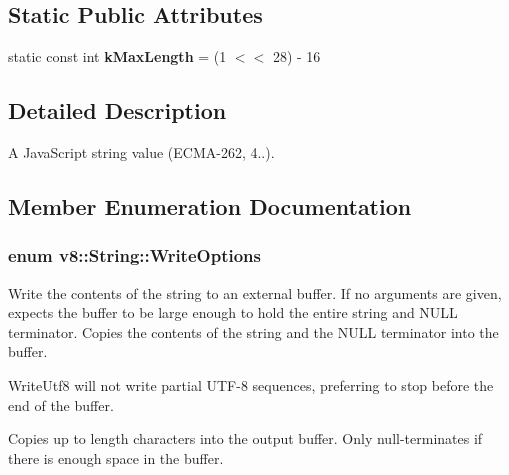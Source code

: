 \subsection*{Static Public Attributes}
\begin{DoxyCompactItemize}
\item 
static const int {\bfseries k\+Max\+Length} = (1 $<$$<$ 28) -\/ 16\hypertarget{classv8_1_1String_a51272e8a71006385863586afb2bb4a62}{}\label{classv8_1_1String_a51272e8a71006385863586afb2bb4a62}

\end{DoxyCompactItemize}


\subsection{Detailed Description}
A Java\+Script string value (E\+C\+M\+A-\/262, 4..). 

\subsection{Member Enumeration Documentation}
\subsubsection[{\texorpdfstring{Write\+Options}{WriteOptions}}]{\setlength{\rightskip}{0pt plus 5cm}enum {\bf v8\+::\+String\+::\+Write\+Options}}\hypertarget{classv8_1_1String_a9ce7f1458ffd08f8eb2b9c8dc056e616}{}\label{classv8_1_1String_a9ce7f1458ffd08f8eb2b9c8dc056e616}
Write the contents of the string to an external buffer. If no arguments are given, expects the buffer to be large enough to hold the entire string and N\+U\+LL terminator. Copies the contents of the string and the N\+U\+LL terminator into the buffer.

Write\+Utf8 will not write partial U\+T\+F-\/8 sequences, preferring to stop before the end of the buffer.

Copies up to length characters into the output buffer. Only null-\/terminates if there is enough space in the buffer.


